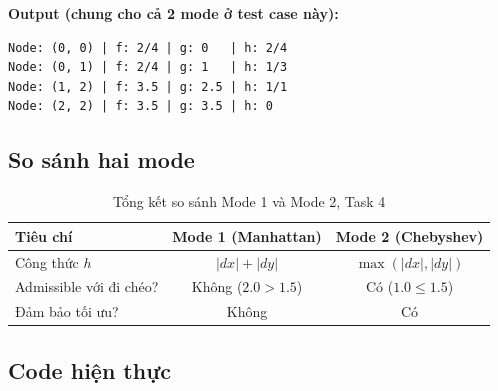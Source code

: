 \documentclass[13pt,a4paper]{article}
\begin{document}
\textbf{Output (chung cho cả 2 mode ở test case này):}
\begin{lstlisting}[language={}, numbers=none]
Node: (0, 0) | f: 2/4 | g: 0   | h: 2/4
Node: (0, 1) | f: 2/4 | g: 1   | h: 1/3
Node: (1, 2) | f: 3.5 | g: 2.5 | h: 1/1
Node: (2, 2) | f: 3.5 | g: 3.5 | h: 0
\end{lstlisting}

\subsection{So sánh hai mode}

\begin{table}[H]
\centering
\begin{tabular}{lcc}
\toprule
\textbf{Tiêu chí} & \textbf{Mode 1 (Manhattan)} & \textbf{Mode 2 (Chebyshev)} \\
\midrule
Công thức $h$ & $|dx|+|dy|$ & $\max(|dx|,|dy|)$ \\
Admissible với đi chéo? & Không ($2.0 > 1.5$) & Có ($1.0 \leq 1.5$) \\
Đảm bảo tối ưu? & Không & Có \\
\bottomrule
\end{tabular}
\caption{Tổng kết so sánh Mode 1 và Mode 2, Task 4}
\end{table}

\subsection{Code hiện thực}
\end{document}
